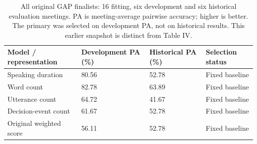 \documentclass[journal]{IEEEtran}
\begin{document}
\begin{table}[t]
\caption{All original GAP finalists: 16 fitting, six development and six historical evaluation meetings. PA is meeting-average pairwise accuracy; higher is better. The primary was selected on development PA, not on historical results. This earlier snapshot is distinct from Table IV.}
\label{tab:6}
\centering\footnotesize
\setlength{\tabcolsep}{3pt}
\renewcommand{\arraystretch}{1.13}
\begin{tabular}{p{}p{}p{}p{}}
\toprule
{\raggedright Model / representation\par} & {\raggedright Development PA (\%)\par} & {\raggedright Historical PA (\%)\par} & {\raggedright Selection status\par} \\
\midrule
{\raggedright Speaking duration\par} & {\raggedright 80.56\par} & {\raggedright 52.78\par} & {\raggedright Fixed baseline\par} \\
{\raggedright Word count\par} & {\raggedright 82.78\par} & {\raggedright 63.89\par} & {\raggedright Fixed baseline\par} \\
{\raggedright Utterance count\par} & {\raggedright 64.72\par} & {\raggedright 41.67\par} & {\raggedright Fixed baseline\par} \\
{\raggedright Decision-event count\par} & {\raggedright 61.67\par} & {\raggedright 52.78\par} & {\raggedright Fixed baseline\par} \\
{\raggedright Original weighted score\par} & {\raggedright 56.11\par} & {\raggedright 52.78\par} & {\raggedright Fixed baseline\par} \\

\end{tabular}
\end{table}
\end{document}
